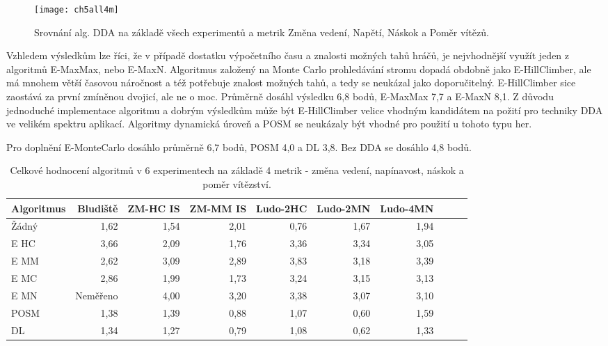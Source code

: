 \begin{figure}
  \centering
  \texttt{[image: ch5all4m]}
	\caption{ Srovnání alg. DDA na základě všech experimentů a metrik Změna vedení, Napětí, Náskok a Poměr vítězů. }
	\label{fig-ch5all4m}
\end{figure}

Vzhledem výsledkům lze říci, že v případě dostatku výpočetního času a znalosti možných tahů hráčů, je nejvhodnější využít jeden z algoritmů E-MaxMax, nebo E-MaxN. Algoritmus založený na Monte Carlo prohledávání stromu dopadá obdobně jako E-HillClimber, ale má mnohem větší časovou náročnost a též potřebuje znalost možných tahů, a tedy se neukázal jako doporučitelný. E-HillClimber sice zaostává za první zmíněnou dvojicí, ale ne o moc. Průměrně dosáhl výsledku 6,8 bodů, E-MaxMax 7,7 a E-MaxN 8,1. Z důvodu jednoduché implementace algoritmu a dobrým výsledkům může být E-HillClimber velice vhodným kandidátem na požití pro techniky DDA ve velikém spektru aplikací. Algoritmy dynamická úroveň a POSM se neukázaly být vhodné pro použití u tohoto typu her.

Pro doplnění E-MonteCarlo dosáhlo průměrně 6,7 bodů, POSM 4,0 a DL 3,8. Bez DDA se dosáhlo 4,8 bodů.

\begin{table*}[b]\footnotesize
\vspace*{0mm}
\caption{{\label{tab-all4m}} Celkové hodnocení algoritmů v 6 experimentech na základě 4 metrik - změna vedení, napínavost, náskok a poměr vítězství.}
\vspace*{0mm}
\label{shadowtable}
\begin{center}
\begin{tabular}{| l || r | r | r | r | r | r | r | r | r |}
\hline
Algoritmus & Bludiště & ZM-HC IS & ZM-MM IS & Ludo-2HC & Ludo-2MN & Ludo-4MN \\
\hline
\hline
Žádný & 1,62 & 1,54 & 2,01 & 0,76 & 1,67 & 1,94\\ \hline  
E HC & 3,66 & 2,09 & 1,76 & 3,36 & 3,34 & 3,05\\ \hline  
E MM & 2,62 & 3,09 & 2,89 & 3,83 & 3,18 & 3,39\\ \hline  
E MC & 2,86 & 1,99 & 1,73 & 3,24 & 3,15 & 3,13\\ \hline  
E MN & Neměřeno & 4,00 & 3,20 & 3,38 & 3,07 & 3,10\\ \hline  
POSM & 1,38 & 1,39 & 0,88 & 1,07 & 0,60 & 1,59\\ \hline  
DL & 1,34 & 1,27 & 0,79 & 1,08 & 0,62 & 1,33 \\ \hline  
\end{tabular}
\end{center}
\end{table*}

\endinput
